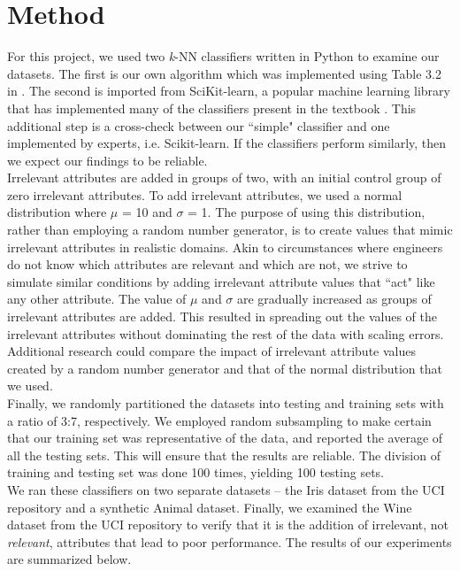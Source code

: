 \documentclass{article}
\begin{document}
\section{Method}

For this project, we used two \textit{k}-NN classifiers written in Python to examine our datasets. The first is our own algorithm which was implemented using Table 3.2 in \cite{kubat}. The second is imported from SciKit-learn, a popular machine learning library that has implemented many of the classifiers present in the textbook \cite{scikit}. This additional step is a cross-check between our ``simple" classifier and one implemented by experts, i.e. Scikit-learn. If the classifiers perform similarly, then we expect our findings to be reliable.  \\  

Irrelevant attributes are added in groups of two, with an initial control group of zero irrelevant attributes. To add irrelevant attributes, we used a normal distribution where $\mu$ = 10 and $\sigma$ = 1. The purpose of using this distribution, rather than employing a random number generator, is to create values that mimic irrelevant attributes in realistic domains. Akin to circumstances where engineers do not know which attributes are relevant and which are not, we strive to simulate similar conditions by adding irrelevant attribute values that ``act" like any other attribute. The value of $\mu$ and $\sigma$ are gradually increased as groups of irrelevant attributes are added. This resulted in spreading out the values of the irrelevant attributes without dominating the rest of the data with scaling errors. Additional research could compare the impact of irrelevant attribute values created by a random number generator and that of the normal distribution that we used.  \\

Finally, we randomly partitioned the datasets into testing and training sets with a ratio of 3:7, respectively. We employed random subsampling to make certain that our training set was representative of the data, and reported the average of all the testing sets. This will ensure that the results are reliable. The division of training and testing set was done 100 times, yielding 100 testing sets. \\   

We ran these classifiers on two separate datasets -- the Iris dataset from the UCI repository and a synthetic Animal dataset. Finally, we examined the Wine dataset from the UCI repository to verify that it is the addition of irrelevant, not \textit{relevant}, attributes that lead to poor performance.  The results of our experiments are summarized below.
\end{document}
